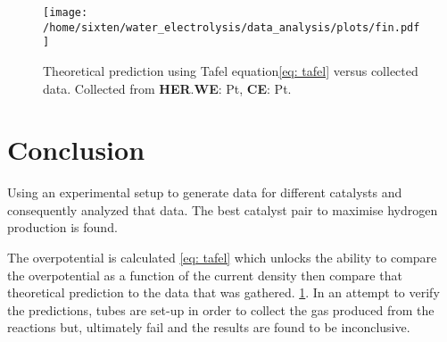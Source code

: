 \documentclass[twocolumn]{revtex4-2}
\begin{document}
\begin{figure}[h]
	\texttt{[image: /home/sixten/water\_electrolysis/data\_analysis/plots/fin.pdf]}
	\caption{Theoretical prediction using Tafel equation\ref{eq: tafel} versus collected data. Collected
	from \textbf{HER}.\newline \textbf{WE}: Pt, \textbf{CE}: Pt.\label{fig: tafel}}
\end{figure}
\section{Conclusion}
Using an experimental setup to generate data for different catalysts and consequently analyzed that data.
The best catalyst pair to maximise hydrogen production is found. 
\par
The overpotential is calculated \ref{eq: tafel} which unlocks the ability to compare the overpotential as a 
function of the current density then compare that theoretical prediction to the data that was gathered.
\ref{fig: tafel}. 
In an attempt to verify the predictions, tubes are set-up in order to collect the gas produced from
the reactions but, ultimately fail and the results are found to be inconclusive.
\pagebreak

\end{document}
